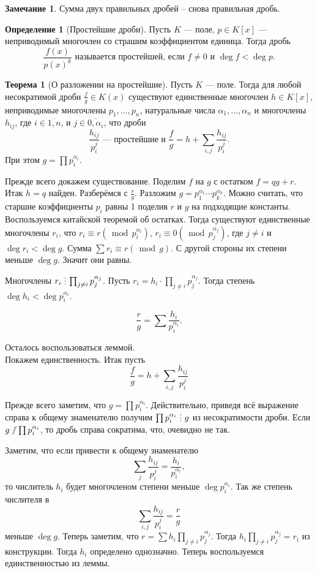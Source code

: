 \documentclass[10pt,a4paper,oneside]{book}
\theoremstyle{definition}
\newtheorem*{rem}{Замечание}
\newtheorem{defn}{Определение}
\newtheorem{thm}{Теорема}
\renewcommand{\mod}{\,\operatorname{mod}\,}
\newcommand{\ovl}{\overline}
\newcommand{\di}{\mathop{\,\scalebox{0.85}{\raisebox{-1.2pt}[0.5\height]{\vdots}}\,}}
\newcommand{\ndi}{\mathop{\not\scalebox{0.85}{\raisebox{-1.2pt}[0.5\height]{\vdots}}\,}}
\def\thrm{\begin{thm}}
\def\ethrm{\end{thm}}
\def\dfn{\begin{defn}}
\def\edfn{\end{defn}}
\def\rm{\begin{rem}}
\def\erm{\end{rem}}
\begin{document}
\rm Сумма двух правильных дробей -- снова правильная дробь.
\erm

\dfn[Простейшие дроби] Пусть $K$ --- поле, $p\in K[x]$ --- неприводимый многочлен со страшим коэффициентом единица. Тогда дробь
$$\frac{f(x)}{p(x)^{k}} \text{ называется простейшей, если $f \neq 0$ и $\deg f < \deg p$}. $$
\edfn



\thrm[О разложении на простейшие] Пусть $K$ ---  поле. Тогда для любой несократимой дроби $\frac{f}{g} \in K(x)$ существуют единственные многочлен $h\in K[x]$, неприводимые многочлены $p_1, \dots, p_n$, натуральные числа $\alpha_1,\dots, \alpha_n$ и многочлены $h_{ij}$, где $i\in \ovl{1,n}$, и $j\in \ovl{0,\alpha_i}$, что дроби
$$ \frac{h_{ij}}{p_i^{j}} \text{ --- простейшие и } \frac{f}{g}=h+\sum_{i,j} \frac{h_{ij}}{p_i^{j}} .$$
При этом $g=\prod p_i^{\alpha_i}$.
\ethrm

\proof Прежде всего докажем существование. Поделим $f$ на $g$ с остатком $f=qg+r$. Итак $h=q$ найден. Разберёмся с $\tfrac{r}{g}$. Разложим $g=p_1^{\alpha_1}\cdots p_k^{\alpha_k}$. Можно считать, что старшие коэффициенты $p_i$ равны 1 поделив $r$ и $g$ на подходящие константы. Воспользуемся китайской теоремой об остатках. Тогда существуют единственные многочлены $r_i$, что $r_i\equiv r (\mod p_i^{\alpha_i})$, $r_i\equiv 0 (\mod p_j^{\alpha_j})$, где $j\neq i$ и $\deg r_i<\deg g$. Сумма $\sum r_i \equiv r (\mod g)$. С другой стороны их степени меньше $\deg g$. Значит они равны. 

Многочлены $r_i\di \prod_{j\neq i} p_j^{\alpha_j}$. Пусть $r_i=h_i\cdot \prod_{j\neq i} p_j^{\alpha_j}$. Тогда степень $\deg h_i< \deg p_i^{\alpha_i}$. 

$$\frac{r}{g}= \sum \frac{h_i}{p_i^{\alpha_i}}.$$ 

Осталось воспользоваться леммой.\\
Покажем единственность. Итак пусть
$$\frac{f}{g}=h+\sum_{i,j} \frac{h_{ij}}{p_i^{j}}$$

Прежде всего заметим, что $g=\prod p_i^{\alpha_i}$. Действительно, приведя всё выражение справа к общему знаменателю получим $\prod p_i^{\alpha_i}\di g$ из несократимости дроби. Если $g \ndi \prod p_i^{\alpha_i}$, то дробь справа сократима, что, очевидно не так.

Заметим, что если привести к общему знаменателю $$ \sum_j \frac{h_{ij}}{p_i^{j}}= \frac{h_i}{p_i^{\alpha_i}},$$ то  числитель $h_i$ будет многочленом степени меньше $\deg {p_i^{\alpha_i}}$. Так же степень числителя в 
$$\sum_{i,j} \frac{h_{ij}}{p_i^{j}}=\frac{r}{g}$$
меньше $\deg g$. Теперь заметим, что $r=\sum h_i\prod_{j\neq i} p_j^{\alpha_j}$. Тогда $h_i\prod_{j\neq i} p_j^{\alpha_j}=r_i$ из конструкции. Тогда $h_i$ определено однозначно. Теперь воспользуемся единственностью из леммы.
\endproof
\end{document}

